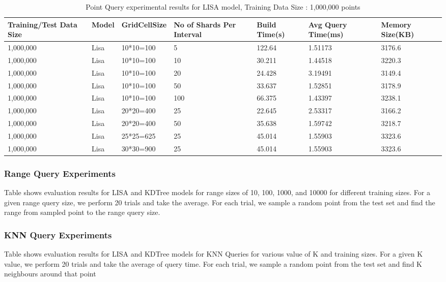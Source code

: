 \begin{table}
	\centering
	\begin{tabular}{||p{}<{\centering}|p{}<{\centering}|p{}<{\centering}| p{}<{\centering}|p{}<{\centering}|p{}<{\centering}|p{}<{\centering}||}
		\hline
		Training/Test Data Size& Model & GridCellSize & No of Shards Per Interval & Build Time(s) & Avg Query Time(ms) & Memory Size(KB)\\ [0.5ex] 
		\hline
		\hline
	 	1,000,000&Lisa& 10*10=100 & 5& 122.64& 1.51173 & 3176.6\\
		\hline
		1,000,000& Lisa& 10*10=100 & 10& 30.211& 1.44518 & 3220.3\\
		\hline
		1,000,000& Lisa& 10*10=100 & 20& 24.428&3.19491 & 3149.4\\
		\hline
		1,000,000& Lisa& 10*10=100 & 50&33.637&1.52851 & 3178.9\\
		\hline
		1,000,000& Lisa& 10*10=100 & 100& 66.375& 1.43397 & 3238.1\\
		\hline
		1,000,000& Lisa& 20*20=400 & 25& 22.645& 2.53317 & 3166.2\\
		\hline
		1,000,000& Lisa& 20*20=400 & 50& 35.638& 1.59742 & 3218.7\\
		\hline
		1,000,000& Lisa& 25*25=625 & 25& 45.014& 1.55903 & 3323.6\\
		\hline
		1,000,000& Lisa& 30*30=900 & 25& 45.014& 1.55903 & 3323.6\\
		\hline
		\hline
	\end{tabular}
	\label{baseline_search_optimization}
	\caption{Point Query experimental results for LISA model, Training Data Size : 1,000,000 points}
\end{table}

\subsubsection {Range Query Experiments}
Table shows evaluation results for LISA and KDTree models for range sizes of 10, 100, 1000, and 10000 for different training sizes. For a given range query size, we perform 20 trials and take the average. For each trial, we sample a random point from the test set and find the range from sampled point to the range query size. 

\subsubsection {KNN Query Experiments}
Table shows evaluation results for LISA and KDTree models for KNN Queries for various value of K and training sizes. For a given K value, we perform 20 trials and take the average of query time. For each trial, we sample a random point from the test set and find K neighbours around that point

